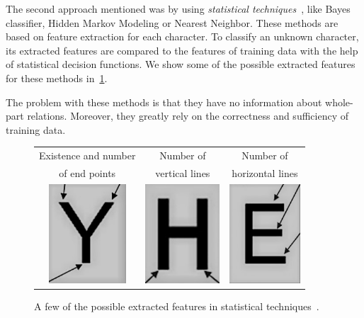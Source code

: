 The second approach mentioned was by using \emph{statistical techniques}~\citep{characterClassification}, like Bayes classifier, Hidden Markov Modeling or Nearest Neighbor. These methods are based on feature extraction for each character. To classify an unknown character, its extracted features are compared to the features of training data with the help of statistical decision functions. We show some of the possible extracted features for these methods in~\cref{fig:characterClassificationStatis}.

The problem with these methods is that they have no information about whole-part relations. Moreover, they greatly rely on the correctness and sufficiency of training data.

\begin{figure}[t]
\centering
{\sffamily
\begin{tabular}{ccc}
Existence and number & Number of & Number of \\
of end points & vertical lines & horizontal lines \\
\includegraphics[height=10em]{img/characterClassification/statis_endPoint.jpg}
&
\includegraphics[height=10em]{img/characterClassification/statis_vertical.jpg}
&
\includegraphics[height=10em]{img/characterClassification/statis_horizontal.jpg} \\
\end{tabular}
}
\caption{A few of the possible extracted features in statistical techniques~\citep{vithlani2015structural}.}
\label{fig:characterClassificationStatis}
\end{figure}


